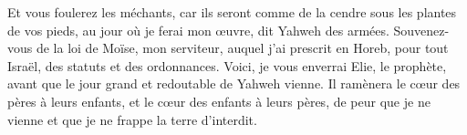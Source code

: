 \begin{multicols}{2}
Et vous foulerez les méchants, car ils seront comme de la cendre sous les plantes de vos pieds, au jour où je ferai mon œuvre, dit Yahweh des armées.
Souvenez-vous de la loi de Moïse, mon serviteur, auquel j'ai prescrit en Horeb, pour tout Israël, des statuts et des ordonnances.
Voici, je vous enverrai Elie, le prophète, avant que le jour grand et redoutable de Yahweh vienne.
Il ramènera le cœur des pères à leurs enfants, et le cœur des enfants à leurs pères, de peur que je ne vienne et que je ne frappe la terre d'interdit.
\PPE{}
\end{multicols}
